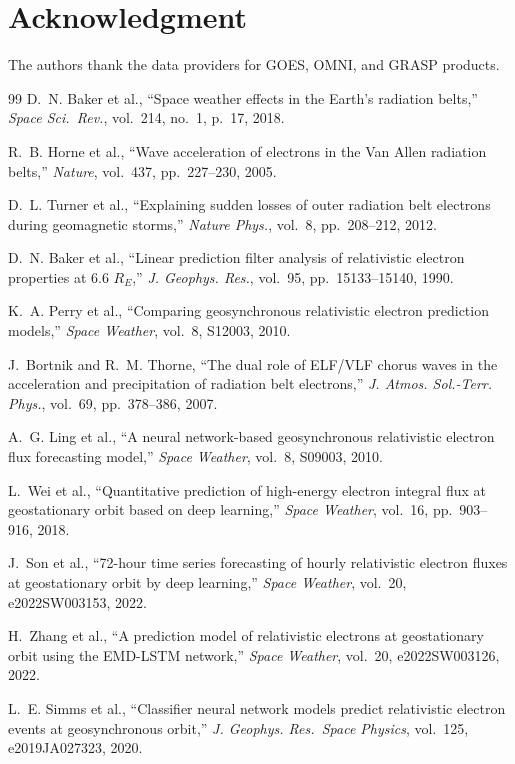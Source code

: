 \documentclass{ieeeaccess}
\begin{document}
\section*{Acknowledgment}
The authors thank the data providers for GOES, OMNI, and GRASP products.

\begin{thebibliography}{99}
D.~N. Baker et al., ``Space weather effects in the Earth's radiation belts,''
\emph{Space Sci.\ Rev.}, vol.~214, no.~1, p.~17, 2018.

R.~B. Horne et al., ``Wave acceleration of electrons in the Van Allen
radiation belts,'' \emph{Nature}, vol.~437, pp.~227--230, 2005.

D.~L. Turner et al., ``Explaining sudden losses of outer radiation belt
electrons during geomagnetic storms,'' \emph{Nature Phys.}, vol.~8,
pp.~208--212, 2012.

D.~N. Baker et al., ``Linear prediction filter analysis of relativistic
electron properties at 6.6 \(R_E\),'' \emph{J. Geophys. Res.}, vol.~95,
pp.~15133--15140, 1990.

K.~A. Perry et al., ``Comparing geosynchronous relativistic electron
prediction models,'' \emph{Space Weather}, vol.~8, S12003, 2010.

J.~Bortnik and R.~M. Thorne, ``The dual role of ELF/VLF chorus waves in
the acceleration and precipitation of radiation belt electrons,''
\emph{J. Atmos. Sol.-Terr. Phys.}, vol.~69, pp.~378--386, 2007.

A.~G. Ling et al., ``A neural network-based geosynchronous relativistic electron flux forecasting model,'' \emph{Space Weather}, vol.~8, S09003, 2010.

L.~Wei et al., ``Quantitative prediction of high-energy electron integral
flux at geostationary orbit based on deep learning,'' \emph{Space Weather},
vol.~16, pp.~903--916, 2018.

J.~Son et al., ``72-hour time series forecasting of hourly relativistic
electron fluxes at geostationary orbit by deep learning,''
\emph{Space Weather}, vol.~20, e2022SW003153, 2022.

H.~Zhang et al., ``A prediction model of relativistic electrons at
geostationary orbit using the EMD-LSTM network,'' \emph{Space Weather},
vol.~20, e2022SW003126, 2022.

L.~E. Simms et al., ``Classifier neural network models predict relativistic
electron events at geosynchronous orbit,'' \emph{J. Geophys. Res.\
Space Physics}, vol.~125, e2019JA027323, 2020.


\end{thebibliography}
\end{document}
